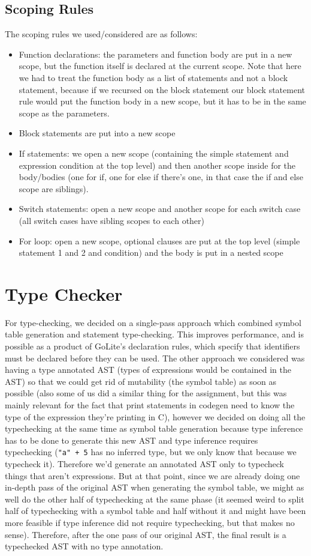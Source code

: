 \documentclass[11pt]{article}
\begin{document}
\subsection{Scoping Rules}
\label{sec:org5e3c3a1}
The scoping rules we used/considered are as follows:
\begin{itemize}
\item Function declarations: the parameters and function body are put
in a new scope, but the function itself is declared at the
current scope. Note that here we had to treat the function body
as a list of statements and not a block statement, because if we
recursed on the block statement our block statement rule would
put the function body in a new scope, but it has to be in the
same scope as the parameters.
\item Block statements are put into a new scope
\item If statements: we open a new scope (containing the simple
statement and expression condition at the top level) and then
another scope inside for the body/bodies (one for if, one for
else if there's one, in that case the if and else scope are
siblings).
\item Switch statements: open a new scope and another scope for each
switch case (all switch cases have sibling scopes to each other)
\item For loop: open a new scope, optional clauses are put at the top
level (simple statement 1 and 2 and condition) and the body is
put in a nested scope
\end{itemize}
\section{Type Checker}
\label{sec:org923c04d}
For type-checking, we decided on a single-pass approach which
combined symbol table generation and statement type-checking. This
improves performance, and is possible as a product of GoLite's
declaration rules, which specify that identifiers must be declared
before they can be used. The other approach we considered was having
a type annotated AST (types of expressions would be contained in the
AST) so that we could get rid of mutability (the symbol table) as
soon as possible (also some of us did a similar thing for the
assignment, but this was mainly relevant for the fact that print
statements in codegen need to know the type of the expression
they're printing in C), however we decided on doing all the
typechecking at the same time as symbol table generation because
type inference has to be done to generate this new AST and type
inference requires typechecking (\texttt{"a" + 5} has no inferred type, but
we only know that because we typecheck it). Therefore we'd generate
an annotated AST only to typecheck things that aren't
expressions. But at that point, since we are already doing one
in-depth pass of the original AST when generating the symbol table,
we might as well do the other half of typechecking at the same phase
(it seemed weird to split half of typechecking with a symbol table
and half without it and might have been more feasible if type
inference did not require typechecking, but that makes no
sense). Therefore, after the one pass of our original AST, the final
result is a typechecked AST with no type annotation.
\end{document}
